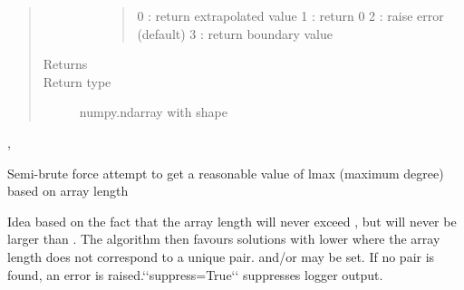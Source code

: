 \documentclass[letterpaper,10pt,english]{sphinxhowto}
\begin{document}
\begin{fulllineitems}
\begin{quote}
\begin{description}
\begin{itemize}
\begin{quote}
0 : return extrapolated value
1 : return 0
2 : raise error (default)
3 : return boundary value
\end{quote}


\end{itemize}

\item[{Returns}] \leavevmode


\item[{Return type}] \leavevmode
numpy.ndarray with shape 

\end{description}\end{quote}




{\hyperref[swtools_doc:swtools.get_l_maxmin]{\emph{}}}, 



\end{fulllineitems}


\begin{fulllineitems}
\label{swtools_doc:swtools.get_l_maxmin}
Semi-brute force attempt to get a reasonable value of lmax
(maximum degree) based on array length

Idea based on the fact that the array length will never exceed
, but  will never be larger than
. The algorithm then favours solutions with lower
 where the array length does not correspond to a unique
 pair.  and/or  may be set. If no pair
is found, an error is raised.{}`{}`suppress=True{}`{}` suppresses logger
output.

\end{fulllineitems}

\end{document}

